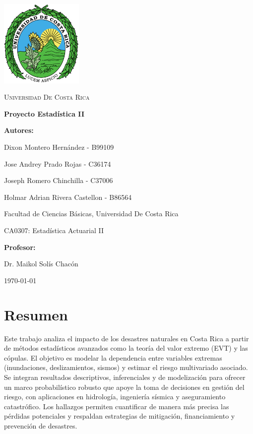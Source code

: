\documentclass[12pt, a4paper]{article}
\begin{document}
\begin{titlepage}
    \centering

    \includegraphics[width=0.3\textwidth]{LogoUCR.png}\par\vspace{1cm}

    {\scshape\LARGE Universidad De Costa Rica \par}
    \vspace{1.5cm}

    {\Huge\bfseries Proyecto Estadística II\par}
    \vspace{1.5cm}

    {\large \bfseries Autores:\par}
    {\Large Dixon Montero Hernández - B99109 \par}
    {\Large Jose Andrey Prado Rojas - C36174 \par}
    {\Large Joseph Romero Chinchilla - C37006\par}
    {\Large Holmar Adrian Rivera Castellon - B86564\par}
    \vspace{0.5cm}
    {\large Facultad de Ciencias Básicas, Universidad De Costa Rica\par}
    {\large CA0307: Estadística Actuarial II}
    \vspace{1cm}

    {\large\bfseries Profesor:\par}
    {\large Dr. Maikol Solís Chacón}

    \vfill

    {\large \today\par}
\end{titlepage}
\section*{Resumen}
Este trabajo analiza el impacto de los desastres naturales en Costa Rica a partir de métodos estadísticos avanzados como la teoría del valor extremo (EVT) y las cópulas. El objetivo es modelar la dependencia entre variables extremas (inundaciones, deslizamientos, sismos) y estimar el riesgo multivariado asociado. Se integran resultados descriptivos, inferenciales y de modelización para ofrecer un marco probabilístico robusto que apoye la toma de decisiones en gestión del riesgo, con aplicaciones en hidrología, ingeniería sísmica y aseguramiento catastrófico. Los hallazgos permiten cuantificar de manera más precisa las pérdidas potenciales y respaldan estrategias de mitigación, financiamiento y prevención de desastres.
\end{document}
